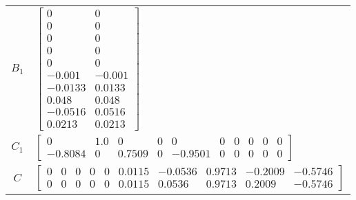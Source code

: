 \begin{tabular}{cl}
 $B_{1}$  & $\left[\begin{matrix}0 & 0\\0 & 0\\0 & 0\\0 & 0\\0 & 0\\-0.001 & -0.001\\-0.0133 & 0.0133\\0.048 & 0.048\\-0.0516 & 0.0516\\0.0213 & 0.0213\end{matrix}\right]$                                                                                                                                                                                                                                                                                                                                                                                                                                                       \\
 $C_{1}$  & $\left[\begin{matrix}0 & 1.0 & 0 & 0 & 0 & 0 & 0 & 0 & 0 & 0\\-0.8084 & 0 & 0.7509 & 0 & -0.9501 & 0 & 0 & 0 & 0 & 0\end{matrix}\right]$                                                                                                                                                                                                                                                                                                                                                                                                                                                                              \\
   $C$    & $\left[\begin{matrix}0 & 0 & 0 & 0 & 0 & 0.0115 & -0.0536 & 0.9713 & -0.2009 & -0.5746\\0 & 0 & 0 & 0 & 0 & 0.0115 & 0.0536 & 0.9713 & 0.2009 & -0.5746\end{matrix}\right]$                                                                                                                                                                                                                                                                                                                                                                                                                                           \\

\end{tabular}
